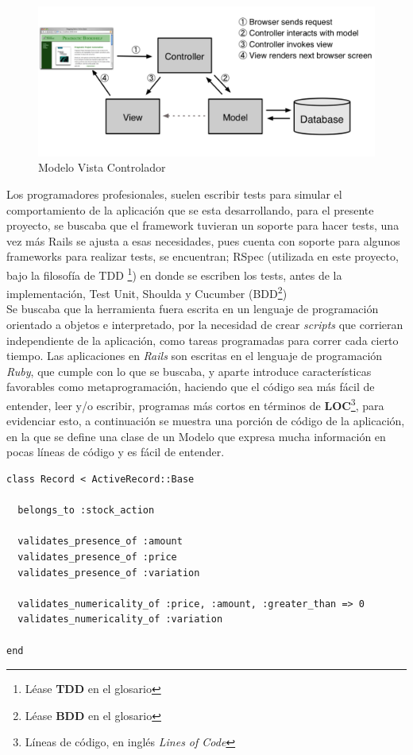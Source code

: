 \begin{figure}[h]
	\centering
		\includegraphics[scale=0.25]{mvc.PNG}
		\caption{Modelo Vista Controlador}
	\label{fig:mvc}
\end{figure}

Los programadores profesionales, suelen escribir tests para simular el comportamiento de la aplicación que se esta desarrollando, para el presente proyecto, se buscaba que el framework tuvieran un soporte para hacer tests, una vez más Rails se ajusta a esas necesidades, pues cuenta con soporte para algunos frameworks para realizar tests, se encuentran; RSpec (utilizada en este proyecto, bajo la filosofía de TDD \footnote{Léase \textbf{TDD} en el glosario}) en donde se escriben los tests, antes de la implementación, Test Unit, Shoulda y Cucumber (BDD\footnote{Léase \textbf{BDD} en el glosario})\\

Se buscaba que la herramienta fuera escrita en un lenguaje de programación orientado a objetos e interpretado, por la necesidad de crear \emph{scripts} que corrieran independiente de la aplicación, como tareas programadas para correr cada cierto tiempo. Las aplicaciones en \emph{Rails} son escritas en el lenguaje de programación \emph{Ruby}, que cumple con lo que se buscaba, y aparte introduce características favorables como metaprogramación, haciendo que el código sea más fácil de entender, leer y/o escribir, programas más cortos en términos de \textbf{LOC}\footnote{Líneas de código, en inglés \emph{Lines of Code}}, para evidenciar esto, a continuación se muestra una porción de código de la aplicación, en la que se define una clase de un Modelo que expresa mucha información en pocas líneas de código y es fácil de entender. \newpage

\begin{verbatim}
class Record < ActiveRecord::Base  

  belongs_to :stock_action

  validates_presence_of :amount
  validates_presence_of :price
  validates_presence_of :variation

  validates_numericality_of :price, :amount, :greater_than => 0
  validates_numericality_of :variation

end
\end{verbatim}

